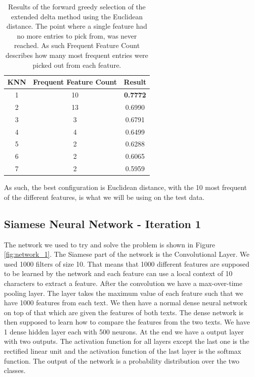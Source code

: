 \begin{table}[]
    \centering
    \begin{tabular}{|c|c|c|}
    \hline
    KNN & Frequent Feature Count & Result          \\ \hline
    1   & 10                     & \textbf{0.7772} \\ \hline
    2   & 13                     & 0.6990          \\ \hline
    3   & 3                      & 0.6791          \\ \hline
    4   & 4                      & 0.6499          \\ \hline
    5   & 2                      & 0.6288          \\ \hline
    6   & 2                      & 0.6065          \\ \hline
    7   & 2                      & 0.5959          \\ \hline
    \end{tabular}
    \caption{Results of the forward greedy selection of the extended delta
        method using the Euclidean distance. The point where a single feature
        had no more entries to pick from, was never reached. As such Frequent
        Feature Count describes how many most frequent entries were picked out
        from each feature.}
    \label{fig:resultsEuc}
\end{table}

As such, the best configuration is Euclidean distance, with the 10 most frequent
of the different features, is what we will be using on the test data.


\subsection{Siamese Neural Network - Iteration 1}

The network we used to try and solve the problem is shown in Figure
\ref{fig:network_1}. The Siamese part of the network is the Convolutional
Layer. We used 1000 filters of size 10. That means that 1000 different features
are supposed to be learned by the network and each feature can use a local
context of 10 characters to extract a feature. After the convolution we have a
max-over-time pooling layer. The layer takes the maximum value of each feature
such that we have 1000 features from each text. We then have a normal dense
neural network on top of that which are given the features of both texts. The
dense network is then supposed to learn how to compare the features from the two
texts. We have 1 dense hidden layer each with 500 neurons. At the end we have
a output layer with two outputs. The activation function for all layers except
the last one is the rectified linear unit and the activation function of the
last layer is the softmax function. The output of the network is a probability
distribution over the two classes.

